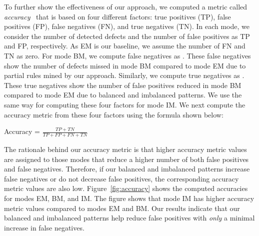 To further show the effectiveness of our approach, we computed a metric called \emph{accuracy}~\cite{tan06:data} that is based on four different factors: true positives (TP), false positives (FP), false negatives (FN), and true negatives (TN). In each mode, we consider the number of detected defects and the number of false positives as TP and FP, respectively. As EM is our baseline, we assume the number of FN and TN as zero. For mode BM, we compute false negatives as . These false negatives show the number of defects missed in mode BM compared to mode EM due to partial rules mined by our approach. Similarly, we compute true negatives as . These true negatives show the number of false positives reduced in mode BM compared to mode EM due to balanced and imbalanced patterns. We use the same way for computing these four factors for mode IM. We next compute the accuracy metric from these four factors using the formula shown below:

\begin{CodeOut}
\hspace*{0.7in}Accuracy = $\frac{TP + TN}{TP + FP + FN + TN}$
\end{CodeOut}
\newline

The rationale behind our accuracy metric is that higher accuracy metric values are assigned to those modes that reduce a higher number of both false positives and false negatives. Therefore, if our balanced and imbalanced patterns increase false negatives or do not decrease false positives, the corresponding accuracy metric values are also low. Figure~\ref{fig:accuracy} shows the computed accuracies for modes EM, BM, and IM. The figure shows that mode IM has higher accuracy metric values compared to modes EM and BM. Our results indicate that our balanced and imbalanced patterns help reduce false positives with \emph{only} a minimal increase in false negatives.

